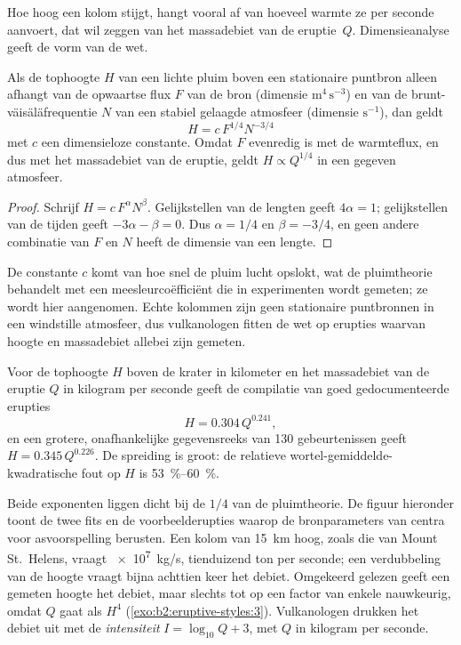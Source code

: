 Hoe hoog een kolom stijgt, hangt vooral af van hoeveel warmte ze per
seconde aanvoert, dat wil zeggen van het massadebiet van de eruptie~$Q$. Dimensieanalyse geeft de
vorm van de wet.

\begin{proposition}\label{prop:b2:eruptive-styles:plume}
Als de tophoogte $H$ van een lichte pluim boven een stationaire puntbron alleen afhangt
van de opwaartse flux $F$ van de bron (dimensie $\mathrm{m^4\,s^{-3}}$) en van de
brunt-väisäläfrequentie $N$ van een stabiel gelaagde atmosfeer (dimensie
$\mathrm{s^{-1}}$), dan geldt
\[
H = c\,F^{1/4}N^{-3/4}
\]
met $c$ een dimensieloze constante. Omdat $F$ evenredig is met de warmteflux, en dus
met het massadebiet van de eruptie, geldt $H \propto Q^{1/4}$ in een gegeven atmosfeer.
\end{proposition}

\begin{proof}
Schrijf $H = c\,F^{\alpha}N^{\beta}$. Gelijkstellen van de lengten geeft $4\alpha = 1$; gelijkstellen van de
tijden geeft $-3\alpha - \beta = 0$. Dus $\alpha = 1/4$ en $\beta = -3/4$, en geen
andere combinatie van $F$ en $N$ heeft de dimensie van een lengte.
\end{proof}

De constante $c$ komt van hoe snel de pluim lucht opslokt, wat de pluimtheorie
behandelt met een meesleurcoëfficiënt die in experimenten wordt gemeten; ze wordt hier
aangenomen. Echte kolommen zijn geen stationaire puntbronnen in een windstille atmosfeer, dus
vulkanologen fitten de wet op erupties waarvan hoogte en massadebiet
allebei zijn gemeten.

\begin{proposition}\label{prop:b2:eruptive-styles:mastin}
Voor de tophoogte $H$ boven de krater in kilometer en het massadebiet van de eruptie
$Q$ in kilogram per seconde geeft de compilatie van goed gedocumenteerde erupties
\[
H = 0.304\,Q^{0.241},
\]
en een grotere, onafhankelijke gegevensreeks van 130 gebeurtenissen geeft $H = 0.345\,Q^{0.226}$.
De spreiding is groot: de relatieve wortel-gemiddelde-kwadratische fout op $H$ is
\qtyrange{53}{60}{\percent}.
\end{proposition}
\admitted

Beide exponenten liggen dicht bij de $1/4$ van de pluimtheorie. De figuur hieronder toont
de twee fits en de voorbeelderupties waarop de bronparameters van
centra voor asvoorspelling berusten. Een kolom van \qty{15}{km} hoog, zoals die van Mount
St.~Helens, vraagt \qty{e7}{kg/s}, tienduizend ton per seconde; een verdubbeling van de
hoogte vraagt bijna achttien keer het debiet. Omgekeerd gelezen geeft een gemeten hoogte
het debiet, maar slechts tot op een factor van enkele nauwkeurig, omdat $Q$ gaat als $H^4$
(\cref{exo:b2:eruptive-styles:3}). Vulkanologen drukken het debiet uit met de \emph{intensiteit} $I =
\log_{10}Q + 3$, met $Q$ in kilogram per seconde.

